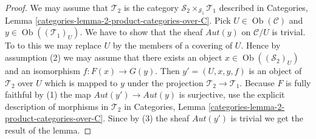 \documentclass{stacks-project}
\theoremstyle{plain}
\theoremstyle{definition}
\theoremstyle{remark}
\numberwithin{equation}{subsection}
\def\Ob{\mathop{\mathrm{Ob}}\nolimits}
\begin{document}
\begin{proof}
We may assume that $\mathcal{T}_2$ is the category
$\mathcal{S}_2 \times_{\mathcal{S}_1} \mathcal{T}_1$
described in
Categories, Lemma \ref{categories-lemma-2-product-categories-over-C}.
Pick $U \in \Ob(\mathcal{C})$ and
$y \in \Ob((\mathcal{T}_1)_U)$.
We have to show that the sheaf $\mathit{Aut}(y)$ on $\mathcal{C}/U$
is trivial. To to this we may replace $U$ by the members of
a covering of $U$. Hence by assumption (2) we may assume that
there exists an object $x \in \Ob((\mathcal{S}_2)_U)$
and an isomorphism $f : F(x) \to G(y)$.
Then $y' = (U, x, y, f)$ is an object of $\mathcal{T}_2$ over $U$
which is mapped to $y$ under the projection $\mathcal{T}_2 \to \mathcal{T}_1$.
Because $F$ is fully faithful by (1) the map
$\mathit{Aut}(y') \to \mathit{Aut}(y)$ is surjective, use the explicit
description of morphisms in $\mathcal{T}_2$ in
Categories, Lemma \ref{categories-lemma-2-product-categories-over-C}.
Since by (3) the sheaf $\mathit{Aut}(y')$ is trivial
we get the result of the lemma.
\end{proof}
\end{document}
